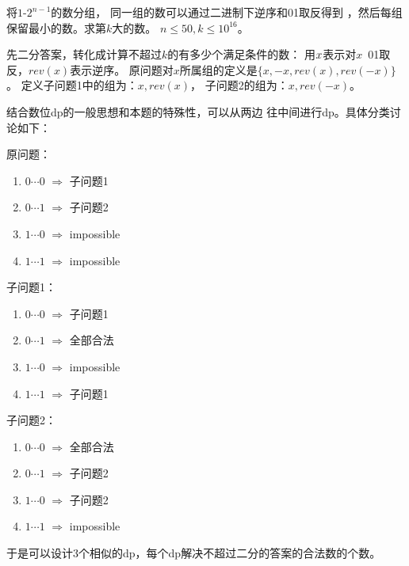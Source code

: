 \begin{prob}
	将$1$-$2^{n-1}$的数分组，
	同一组的数可以通过二进制下逆序和01取反得到
	，然后每组保留最小的数。求第$k$大的数。
	$n \le 50, k \le 10^{16}$。
\end{prob}

\begin{sol}
	先二分答案，转化成计算不超过$k$的有多少个满足条件的数：
	用$\-x$表示对$x$\ 01取反，$rev(x)$表示逆序。
	原问题对$x$所属组的定义是$\{x,-x,rev(x),rev(-x)\}$。
	定义子问题1中的组为：${x,rev(x)}$，
	子问题2的组为：${x,rev(-x)}$。
	\par 
	结合数位dp的一般思想和本题的特殊性，可以从两边
	往中间进行dp。具体分类讨论如下：
	\par
	原问题：
	\begin{enumerate}
		\item $0 \cdots 0$ $\Rightarrow$ 子问题1
		\item $0 \cdots 1$ $\Rightarrow$ 子问题2
		\item $1 \cdots 0$ $\Rightarrow$ impossible
		\item $1 \cdots 1$ $\Rightarrow$ impossible
	\end{enumerate}
	\par
	子问题1：
	\begin{enumerate}
		\item $0 \cdots 0$ $\Rightarrow$ 子问题1
		\item $0 \cdots 1$ $\Rightarrow$ 全部合法
		\item $1 \cdots 0$ $\Rightarrow$ impossible
		\item $1 \cdots 1$ $\Rightarrow$ 子问题1
	\end{enumerate}
	\par
	子问题2：
	\begin{enumerate}
		\item $0 \cdots 0$ $\Rightarrow$ 全部合法
		\item $0 \cdots 1$ $\Rightarrow$ 子问题2
		\item $1 \cdots 0$ $\Rightarrow$ 子问题2
		\item $1 \cdots 1$ $\Rightarrow$ impossible
	\end{enumerate}
	于是可以设计3个相似的dp，每个dp解决不超过二分的答案的合法数的个数。
\end{sol}
